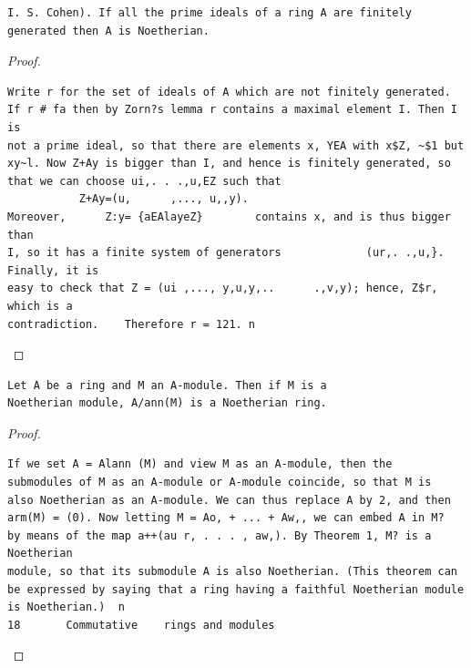 \begin{theorem}\label{mcrt-auto-theorem-3-4}\uses{}
\begin{verbatim}
I. S. Cohen). If all the prime ideals of a ring A are finitely
generated then A is Noetherian.
\end{verbatim}
\end{theorem}
\begin{proof}
\begin{verbatim}
Write r for the set of ideals of A which are not finitely generated.
If r # fa then by Zorn?s lemma r contains a maximal element I. Then I is
not a prime ideal, so that there are elements x, YEA with x$Z, ~$1 but
xy~l. Now Z+Ay is bigger than I, and hence is finitely generated, so
that we can choose ui,. . .,u,EZ such that
           Z+Ay=(u,      ,..., u,,y).
Moreover,      Z:y= {aEAlayeZ}        contains x, and is thus bigger than
I, so it has a finite system of generators             (ur,. .,u,}. Finally, it is
easy to check that Z = (ui ,..., y,u,y,..      .,v,y); hence, Z$r, which is a
contradiction.    Therefore r = 121. n
\end{verbatim}
\end{proof}


\begin{theorem}\label{mcrt-auto-theorem-3-5}\uses{}
\begin{verbatim}
Let A be a ring and M an A-module. Then if M is a
Noetherian module, A/ann(M) is a Noetherian ring.
\end{verbatim}
\end{theorem}
\begin{proof}
\begin{verbatim}
If we set A = Alann (M) and view M as an A-module, then the
submodules of M as an A-module or A-module coincide, so that M is
also Noetherian as an A-module. We can thus replace A by 2, and then
arm(M) = (0). Now letting M = Ao, + ... + Aw,, we can embed A in M?
by means of the map a++(au r, . . . , aw,). By Theorem 1, M? is a Noetherian
module, so that its submodule A is also Noetherian. (This theorem can
be expressed by saying that a ring having a faithful Noetherian module
is Noetherian.)  n
18       Commutative    rings and modules
\end{verbatim}
\end{proof}


